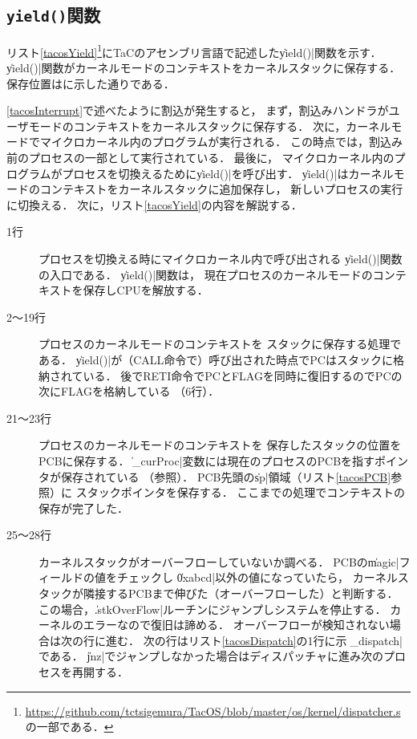 \subsection{\texttt{yield()}関数}
リスト\ref{tacosYield}\footnote{
  \url{https://github.com/tctsigemura/TacOS/blob/master/os/kernel/dispatcher.s}
  の一部である．
}にTaCのアセンブリ言語で記述した\|yield()|関数を示す．
\|yield()|関数がカーネルモードのコンテキストをカーネルスタックに保存する．
保存位置はに示した通りである．

\ref{tacosInterrupt}で述べたように割込が発生すると，
まず，割込みハンドラがユーザモードのコンテキストをカーネルスタックに保存する．
次に，カーネルモードでマイクロカーネル内のプログラムが実行される．
この時点では，割込み前のプロセスの一部として実行されている．
最後に，
マイクロカーネル内のプログラムがプロセスを切換えるために\|yield()|を呼び出す．
\|yield()|はカーネルモードのコンテキストをカーネルスタックに追加保存し，
新しいプロセスの実行に切換える．
次に，リスト\ref{tacosYield}の内容を解説する．



\begin{description}
\item[1行] プロセスを切換える時にマイクロカーネル内で呼び出される
  \|yield()|関数の入口である．
  \|yield()|関数は，
  現在プロセスのカーネルモードのコンテキストを保存しCPUを解放する．
\item[2〜19行] プロセスのカーネルモードのコンテキストを
  スタックに保存する処理である．
  \|yield()|が（CALL命令で）呼び出された時点でPCはスタックに格納されている．
  後でRETI命令でPCとFLAGを同時に復旧するのでPCの次にFLAGを格納している
  （6行）．
\item[21〜23行] プロセスのカーネルモードのコンテキストを
  保存したスタックの位置をPCBに保存する．
  \|_curProc|変数には現在のプロセスのPCBを指すポインタが保存されている
  （参照）．
  PCB先頭の\|sp|領域（リスト\ref{tacosPCB}参照）に
  スタックポインタを保存する．
  ここまでの処理でコンテキストの保存が完了した．
\item[25〜28行] カーネルスタックがオーバーフローしていないか調べる．
  PCBの\|magic|フィールドの値をチェックし
  \|0xabcd|以外の値になっていたら，
  カーネルスタックが隣接するPCBまで伸びた（オーバーフローした）と判断する．
  この場合，\|.stkOverFlow|ルーチンにジャンプしシステムを停止する．
  カーネルのエラーなので復旧は諦める．
  オーバーフローが検知されない場合は次の行に進む．
  次の行はリスト\ref{tacosDispatch}の1行に示す\|_dispatch|である．
  \|jnz|でジャンプしなかった場合はディスパッチャに進み次のプロセスを再開する．
\end{description}

